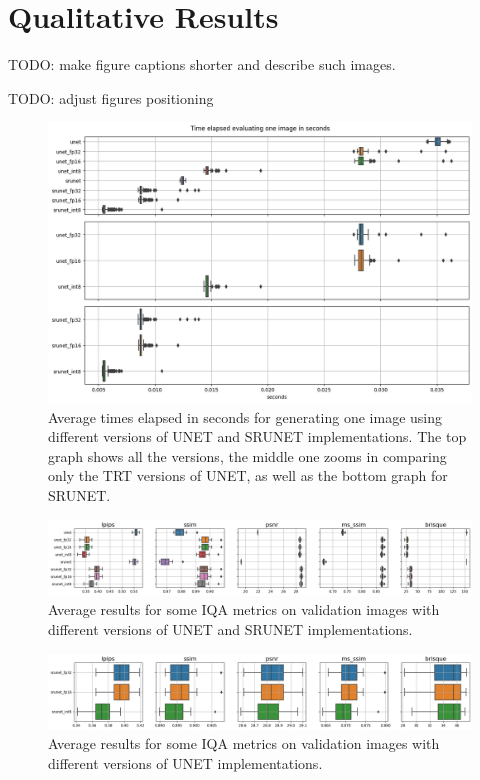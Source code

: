 \section{Qualitative Results}

TODO: make figure captions shorter and describe such images.

TODO: adjust figures positioning

\begin{figure}[h]
  \includegraphics[width=1.0\textwidth]{static/2023_03_02_boxplots_timings_all.png}
  \caption{Average times elapsed in seconds for generating one image using different versions of UNET and SRUNET implementations. The top graph shows all the versions, the middle one zooms in comparing only the TRT versions of UNET, as well as the bottom graph for SRUNET.}
\end{figure}

\begin{figure}[h]
\includegraphics[width=1.0\textwidth]{static/2023_03_02_boxplots_metrics_all.png}
\caption{Average results for some IQA metrics on validation images with different versions of UNET and SRUNET implementations.}
\end{figure}

\begin{figure}[h]
\includegraphics[width=1.0\textwidth]{static/2023_03_02_boxplots_metrics_quant_SRUNet.png}
\caption{Average results for some IQA metrics on validation images with different versions of UNET implementations.}
\end{figure}

